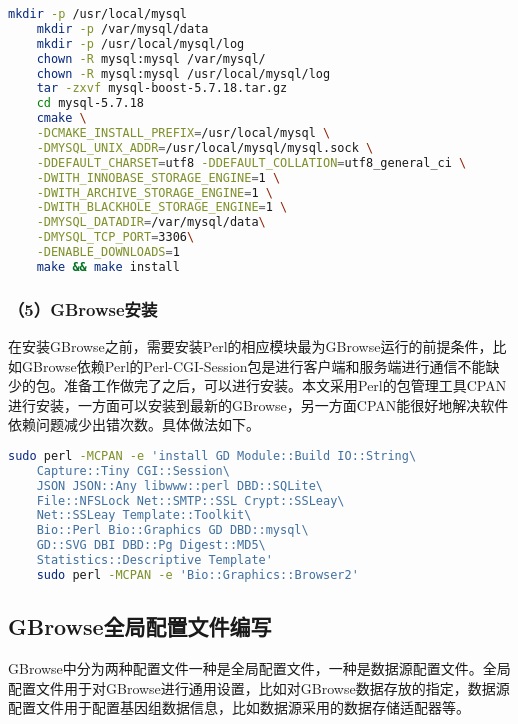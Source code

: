 	\begin{lstlisting}[language=bash]
	mkdir -p /usr/local/mysql
	mkdir -p /var/mysql/data
	mkdir -p /usr/local/mysql/log
	chown -R mysql:mysql /var/mysql/
	chown -R mysql:mysql /usr/local/mysql/log
	tar -zxvf mysql-boost-5.7.18.tar.gz
	cd mysql-5.7.18
	cmake \
	-DCMAKE_INSTALL_PREFIX=/usr/local/mysql \
	-DMYSQL_UNIX_ADDR=/usr/local/mysql/mysql.sock \
	-DDEFAULT_CHARSET=utf8 -DDEFAULT_COLLATION=utf8_general_ci \
	-DWITH_INNOBASE_STORAGE_ENGINE=1 \
	-DWITH_ARCHIVE_STORAGE_ENGINE=1 \
	-DWITH_BLACKHOLE_STORAGE_ENGINE=1 \
	-DMYSQL_DATADIR=/var/mysql/data\
	-DMYSQL_TCP_PORT=3306\
	-DENABLE_DOWNLOADS=1
	make && make install
	\end{lstlisting}
	\subsubsection{（5）GBrowse安装}
	在安装GBrowse之前，需要安装Perl的相应模块最为GBrowse运行的前提条件，比如GBrowse依赖Perl的Perl-CGI-Session包是进行客户端和服务端进行通信不能缺少的包。准备工作做完了之后，可以进行安装。本文采用Perl的包管理工具CPAN进行安装，一方面可以安装到最新的GBrowse，另一方面CPAN能很好地解决软件依赖问题减少出错次数。具体做法如下。
	\begin{lstlisting}[language=bash]
	sudo perl -MCPAN -e 'install GD Module::Build IO::String\
	Capture::Tiny CGI::Session\
	JSON JSON::Any libwww::perl DBD::SQLite\
	File::NFSLock Net::SMTP::SSL Crypt::SSLeay\
	Net::SSLeay Template::Toolkit\
	Bio::Perl Bio::Graphics GD DBD::mysql\
	GD::SVG DBI DBD::Pg Digest::MD5\
	Statistics::Descriptive Template'
	sudo perl -MCPAN -e 'Bio::Graphics::Browser2'
	\end{lstlisting}
	\subsection{GBrowse全局配置文件编写}
	GBrowse中分为两种配置文件一种是全局配置文件，一种是数据源配置文件。全局配置文件用于对GBrowse进行通用设置，比如对GBrowse数据存放的指定，数据源配置文件用于配置基因组数据信息，比如数据源采用的数据存储适配器等。

